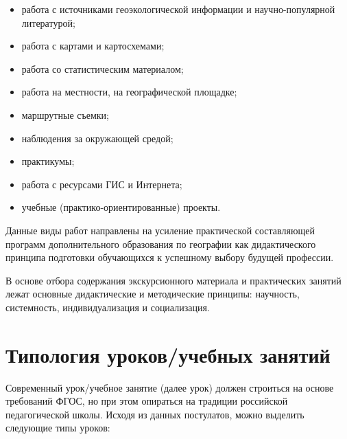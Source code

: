 \documentclass[
  11pt,
  russian,
]{book}
\begin{document}
\begin{itemize}
\item
  работа с источниками геоэкологической информации и научно-популярной литературой;
\item
  работа с картами и картосхемами;
\item
  работа со статистическим материалом;
\item
  работа на местности, на географической площадке;
\item
  маршрутные съемки;
\item
  наблюдения за окружающей средой;
\item
  практикумы;
\item
  работа с ресурсами ГИС и Интернета;
\item
  учебные (практико-ориентированные) проекты.
\end{itemize}

Данные виды работ направлены на усиление практической составляющей программ дополнительного образования по географии как дидактического принципа подготовки обучающихся к успешному выбору будущей профессии.

В основе отбора содержания экскурсионного материала и практических занятий лежат основные дидактические и методические принципы: научность, системность, индивидуализация и социализация.

\hypertarget{ux442ux438ux43fux43eux43bux43eux433ux438ux44f-ux443ux440ux43eux43aux43eux432ux443ux447ux435ux431ux43dux44bux445-ux437ux430ux43dux44fux442ux438ux439}{%
\section*{Типология уроков/учебных занятий}\label{ux442ux438ux43fux43eux43bux43eux433ux438ux44f-ux443ux440ux43eux43aux43eux432ux443ux447ux435ux431ux43dux44bux445-ux437ux430ux43dux44fux442ux438ux439}}

Современный урок/учебное занятие (далее урок) должен строиться на основе требований ФГОС, но при этом опираться на традиции российской педагогической школы. Исходя из данных постулатов, можно выделить следующие типы уроков:
\end{document}
